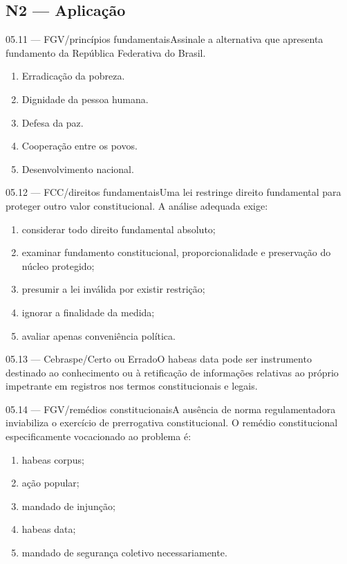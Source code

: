 \subsection*{N2 — Aplicação}
\begin{questao}{ 05.11 — FGV/princípios fundamentais}Assinale a alternativa que apresenta fundamento da República Federativa do Brasil.\begin{enumerate}[label=\Alph*)]\item Erradicação da pobreza.\item Dignidade da pessoa humana.\item Defesa da paz.\item Cooperação entre os povos.\item Desenvolvimento nacional.\end{enumerate}\end{questao}
\begin{questao}{ 05.12 — FCC/direitos fundamentais}Uma lei restringe direito fundamental para proteger outro valor constitucional. A análise adequada exige:\begin{enumerate}[label=\Alph*)]\item considerar todo direito fundamental absoluto;\item examinar fundamento constitucional, proporcionalidade e preservação do núcleo protegido;\item presumir a lei inválida por existir restrição;\item ignorar a finalidade da medida;\item avaliar apenas conveniência política.\end{enumerate}\end{questao}
\begin{questao}{ 05.13 — Cebraspe/Certo ou Errado}O habeas data pode ser instrumento destinado ao conhecimento ou à retificação de informações relativas ao próprio impetrante em registros nos termos constitucionais e legais.\end{questao}
\begin{questao}{ 05.14 — FGV/remédios constitucionais}A ausência de norma regulamentadora inviabiliza o exercício de prerrogativa constitucional. O remédio constitucional especificamente vocacionado ao problema é:\begin{enumerate}[label=\Alph*)]\item habeas corpus;\item ação popular;\item mandado de injunção;\item habeas data;\item mandado de segurança coletivo necessariamente.\end{enumerate}\end{questao}
